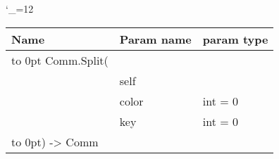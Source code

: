 \begingroup \catcode`\_=12 \tt
\begin{tabular}{lll}
\toprule
\textrm{Name}&\textrm{Param name}&\textrm{param type}\\
\midrule
\hbox to 0pt {Comm.Split(\hss}\\
& self\\
& color & int = 0\\
& key & int = 0\\
\hbox to 0pt{) -> Comm\hss}\\
\bottomrule
\end{tabular}
\endgroup
